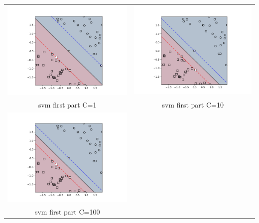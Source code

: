 \documentclass{article}
\begin{document}
\begin{tabular}{c|c}
\includegraphics[scale=0.4]{hw3images/svmfirstpartc=1.png}&\includegraphics[scale=0.4]{hw3images/svmfirstpartc=10.png}\\
{svm first part C=1}&{svm first part C=10}\\
\includegraphics[scale=0.4]{hw3images/svmfirstpartc=100.png}&\\
{svm first part C=100}&\\
\end{tabular}
\end{document}
